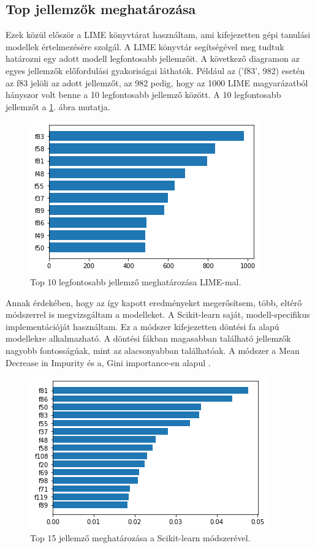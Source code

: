 \subsection{Top jellemzők meghatározása}

Ezek közül először a LIME \cite{lime2016} könyvtárat használtam, ami kifejezetten gépi tanulási modellek értelmezésére szolgál. A LIME könyvtár segítségével meg tudtuk határozni egy adott modell legfontosabb jellemzőit. A következő diagramon az egyes jellemzők előfordulási gyakoriságai láthatók. Például az (’f83’, 982) esetén az f83 jelöli az adott jellemzőt, az 982 pedig, hogy az 1000 LIME magyarázatból hányszor volt benne a 10 legfontosabb jellemző között. A 10 legfontosabb jellemzőt a \ref{fig:lime}. ábra mutatja.

\begin{figure}[ht]
	\centering
	\includegraphics[width=0.7\columnwidth]{figures/imp_lime.png}
	\caption{Top 10 legfontosabb jellemző meghatározása LIME-mal.}
	\label{fig:lime}
\end{figure}

Annak érdekében, hogy az így kapott eredményeket megerősítsem, több, eltérő módszerrel is megvizsgáltam a modelleket. A Scikit-learn saját, modell-specifikus implementációját használtam. Ez a módszer kifejezetten döntési fa alapú modellekre alkalmazható. A döntési fákban magasabban található jellemzők nagyobb fontosságúak, mint az alacsonyabban találhatóak. A módszer a Mean Decrease in Impurity és a, Gini importance-en alapul \cite{breiman2017classification}.

\begin{figure}[ht]
	\centering
	\includegraphics[width=0.7\columnwidth]{figures/imp_gini.png}
	\caption{Top 15 jellemző meghatározása a Scikit-learn módszerével.}
\end{figure}


